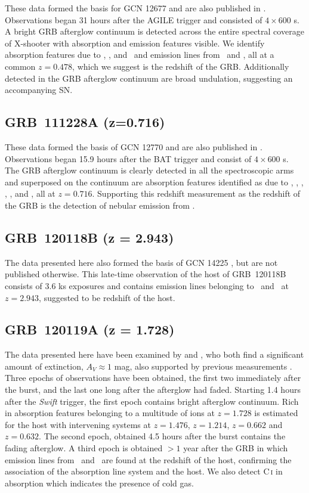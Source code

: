 \documentclass[longauth]{aa}    %
\begin{document}
These data formed the basis for GCN 12677 \citep{GCN12677} and are also
published in \cite{Kruhler2015}. Observations began 31 hours after the AGILE
trigger and consisted of $4 \times 600$ s. A bright GRB afterglow continuum is
detected across the entire spectral coverage of X-shooter with absorption and
emission features visible. We identify absorption features due to \feii, \mgii,
and \caii~and emission lines from \oiii~and \ha, all at a common $z = 0.478$,
which we suggest is the redshift of the GRB. Additionally detected in the GRB
afterglow continuum are broad undulation, suggesting an accompanying SN.

\subsection{GRB~111228A (z=0.716)} \label{111228}

These data formed the basis of GCN 12770 \citep{GCN12770} and are also published
in \cite{Kruhler2015}. Observations began 15.9 hours after the BAT trigger and
consist of $4 \times 600$ s. The GRB afterglow continuum is clearly detected in
all the spectroscopic arms and superposed on the continuum are absorption
features identified as due to \feii, \mnii, \mgii, \mgi, \cah, and \cak, all at
$z = 0.716$. Supporting this redshift measurement as the redshift of the GRB is
the detection of nebular emission from \oiii.

\subsection{GRB~120118B (z = 2.943)} \label{120118}

The data presented here also formed the basis of GCN 14225 \citep{GCN14225}, but
are not published otherwise. This late-time observation of the host of
GRB~120118B consists of 3.6 ks exposures and contains emission lines belonging
to \oii~and \oiii~at $z = 2.943$, suggested to be redshift of the host.

\subsection{GRB~120119A (z = 1.728)} \label{120119}

The data presented here have been examined by \citet{Japelj2015} and
\citet{2018MNRAS.479.1542Z}, who both find a significant amount of extinction,
$A_V\approx 1$ mag, also supported by previous measurements \citep{Morgan2014a}.
Three epochs of observations have been obtained, the first two immediately after
the burst, and the last one long after the afterglow had faded. Starting 1.4
hours after the \textit{Swift} trigger, the first epoch contains bright
afterglow continuum. Rich in absorption features belonging to a multitude of
ions at $z = 1.728$ is estimated for the host with intervening systems at $z =
1.476$, $z = 1.214$, $z = 0.662$ and $z = 0.632$. The second epoch, obtained 4.5
hours after the burst contains the fading afterglow. A third epoch is obtained
$>1$ year after the GRB in which emission lines from \hb~and \ha~are found at
the redshift of the host, confirming the association of the absorption line
system and the host. We also detect C\,\textsc{i} in absorption which indicates
the presence of cold gas.
\end{document}
